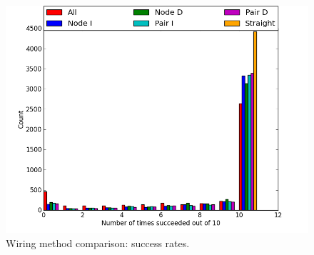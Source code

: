 \begin{figure}[H]
\begin{center}
\includegraphics[width=\textwidth]{Images/wiring_success_comparison.png}
\caption{Wiring method comparison: success rates.}
\label{fig:wiring_success}
\end{center}
\end{figure}

